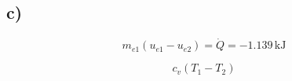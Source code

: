 

\subsection*{c)}

\[
m_{e1} (u_{e1} - u_{e2}) = \dot{Q} = -1.139 \, \text{kJ}
\]

\[
c_v (T_1 - T_2)
\]
